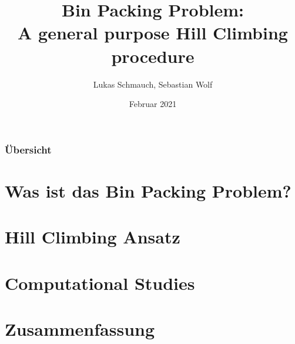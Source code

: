 \documentclass{beamer}
\title[BPP]{Bin Packing Problem:\\ A general purpose Hill Climbing procedure } %
\institute[FSU-Jena] %
{ 
Seminar Modern Heuristics \\
Dr. Rico Walter
}
\author{Lukas Schmauch, Sebastian Wolf}
\date{Februar 2021} %
\begin{document}
\begin{frame}
\titlepage %
\end{frame}
\begin{frame}
\frametitle{Übersicht} 
\tableofcontents
\section{Was ist das Bin Packing Problem?} 
\section{Hill Climbing Ansatz} 
\section{Computational Studies}
\section{Zusammenfassung} 
\end{frame}

\end{document}

